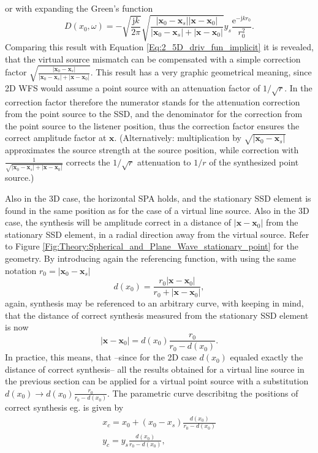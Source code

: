 \documentclass[12pt,a4paper]{article}
\newcommand{\te}{\mathrm{e}}
\newcommand{\ti}{\mathrm{j}}
\newcommand{\vx}{\mathbf{x}}
\newcommand{\vxo}{\mathbf{x}_0}
\begin{document}
or with expanding the Green's function
\begin{equation}
D(x_0,\omega) = 
- \sqrt{\frac{\ti k}{2\pi}} \sqrt{\frac{| \vxo - \mathbf{x}_s | | \vx - \vxo|  }{| \vxo - \mathbf{x}_s | + | \vx - \vxo| }}  y_s \frac{\te^{-\ti k r_0 }}{r_0^2}.
\label{Eq:2_5D_point_source_implicit_df}
\end{equation}
Comparing this result with Equation \eqref{Eq:2_5D_driv_fun_implicit} it is revealed, that the virtual source mismatch can be compensated with a simple correction factor $\sqrt{\frac{| \vxo - \mathbf{x}_s |  }{| \vxo - \mathbf{x}_s | + | \vx - \vxo| }}$. This result has a very graphic geometrical meaning, since 2D WFS would assume a point source with an attenuation factor of $1/\sqrt{r}$. In the correction factor therefore the numerator stands for the attenuation correction from the point source to the SSD, and the denominator for the correction from the point source to the listener position, thus the correction factor ensures the correct amplitude factor at $\vx$. (Alternatively: multiplication by $\sqrt{| \vxo - \mathbf{x}_s |}$ approximates the source strength at the source position, while correction with $\frac{1}{\sqrt{| \vxo - \mathbf{x}_s | + | \vx - \vxo| }}$ corrects the $1/\sqrt{r}$ attenuation to $1/r$ of the synthesized point source.)

\vspace{3mm}
Also in the 3D case, the horizontal SPA holds, and the stationary SSD element is found in the same position as for the case of a virtual line source. Also in the 3D case, the synthesis will be amplitude correct in a distance of $| \vx - \vxo| $ from the stationary SSD element, in a radial direction away from the virtual source. Refer to Figure \ref{Fig:Theory:Spherical_and_Plane_Wave_stationary_point} for the geometry. By introducing again the referencing function, with using the same notation $r_0 = | \vxo - \mathbf{x}_s |$ 
\begin{equation}
d(x_0) = \frac{ r_0 | \vx - \vxo|  }{ r_0 + | \vx - \vxo| },
\end{equation}
again, synthesis may be referenced to an arbitrary curve, with keeping in mind, that the distance of correct synthesis measured from the stationary SSD element is now
\begin{equation}
|\vx - \vxo| = d(x_0)\frac{r_0}{r_0 - d(x_0)}.
\end{equation}
In practice, this means, that --since for the 2D case $d(x_0)$ equaled exactly the distance of correct synthesis-- all the results obtained for a virtual line source in the previous section can be applied for a virtual point source with a substitution $d(x_0) \rightarrow d(x_0)\frac{r_0}{r_0 - d(x_0)}$. The parametric curve describitng the positions of correct synthesis eg. is given by 
\begin{eqnarray}
x_c = x_0 + (x_0-x_s) \frac{d(x_0)}{r_0 - d(x_0)} \\
y_c = y_s \frac{d(x_0)}{r_0 - d(x_0)},
\label{Eq:3D_curve}
\end{eqnarray}
\end{document}
